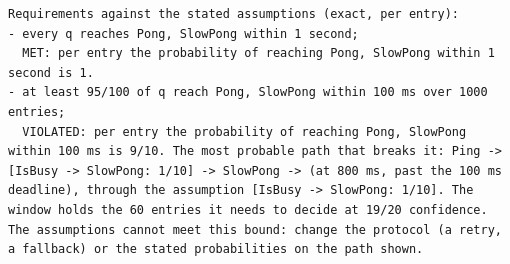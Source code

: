 \begin{lstlisting}[language={},basicstyle=\ttfamily\footnotesize,breaklines=true]
Requirements against the stated assumptions (exact, per entry):
- every q reaches Pong, SlowPong within 1 second;
  MET: per entry the probability of reaching Pong, SlowPong within 1 second is 1.
- at least 95/100 of q reach Pong, SlowPong within 100 ms over 1000 entries;
  VIOLATED: per entry the probability of reaching Pong, SlowPong within 100 ms is 9/10. The most probable path that breaks it: Ping -> [IsBusy -> SlowPong: 1/10] -> SlowPong -> (at 800 ms, past the 100 ms deadline), through the assumption [IsBusy -> SlowPong: 1/10]. The window holds the 60 entries it needs to decide at 19/20 confidence. The assumptions cannot meet this bound: change the protocol (a retry, a fallback) or the stated probabilities on the path shown.
\end{lstlisting}

